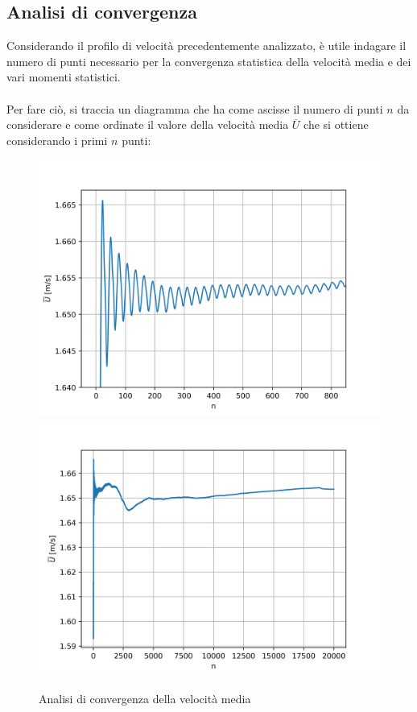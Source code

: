 \subsection{Analisi di convergenza}
Considerando il profilo di velocità precedentemente analizzato, è utile indagare il numero di punti necessario per la convergenza statistica della velocità media e dei vari momenti statistici.\\\\
Per fare ciò, si traccia un diagramma che ha come ascisse il numero di punti $n$ da considerare e come ordinate il valore della velocità media $\overline U$ che si ottiene considerando i primi $n$ punti:
\begin{figure}[H]
    \centering
    \includegraphics[width=.48\textwidth]{images/10/conv2.png}
    \includegraphics[width=.48\textwidth]{images/10/conv1.png}
    \caption{Analisi di convergenza della velocità media}
\end{figure}

